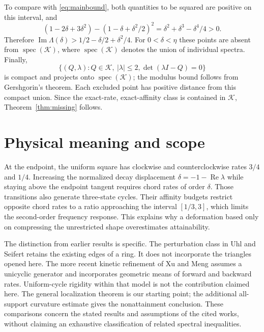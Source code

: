 \documentclass[11pt,a4paper]{article}
\newcommand{\K}{\mathcal K}
\newcommand{\spec}{\operatorname{spec}}
\newcommand{\Rea}{\operatorname{Re}}
\newcommand{\Ima}{\operatorname{Im}}
\begin{document}
To compare with \eqref{eq:mainbound}, both quantities to be squared
are positive on this interval, and
\begin{equation}\label{eq:separation}
 (1-2\delta+3\delta^2)-(1-\delta+\delta^2/2)^2
 =\delta^2+\delta^3-\delta^4/4>0.
\end{equation}
Therefore $\Ima\Lambda(\delta)>1/2-\delta/2+\delta^2/4$.
For $0<\delta<\eta$ these points are absent from $\spec(\K)$,
where $\spec(\K)$ denotes the union of individual spectra.
Finally,
\begin{equation}
 \{(Q,\lambda):Q\in\K,\ |\lambda|\leq2,
                  \det(\lambda I-Q)=0\}
\end{equation}
is compact and projects onto $\spec(\K)$; the modulus bound follows
from Gershgorin's theorem. Each excluded point has positive distance
from this compact union. Since the exact-rate, exact-affinity class
is contained in $\K$, Theorem~\ref{thm:missing} follows.

\section{Physical meaning and scope}

At the endpoint, the uniform square has clockwise and counterclockwise
rates $3/4$ and $1/4$. Increasing the normalized decay displacement
$\delta=-1-\Rea\lambda$ while staying above the endpoint tangent
requires chord rates of order $\delta$. Those transitions also generate
three-state cycles. Their affinity budgets restrict opposite chord rates
to a ratio approaching the interval $[1/3,3]$, which limits the
second-order frequency response. This explains why a deformation based
only on compressing the unrestricted shape overestimates attainability.

The distinction from earlier results is specific. The perturbation
class in Uhl and Seifert \cite[Sec.~4.1, condition~(i), and
Sec.~4.2]{UhlSeifert2019} retains the existing edges of a ring.
It does not incorporate the triangles opened here. The more recent
kinetic refinement of Xu and Meng \cite[Secs.~II--III and
Corollary~3]{XuMeng2026} assumes a unicyclic generator and incorporates
geometric means of forward and backward rates. Uniform-cycle rigidity
within that model is not the contribution claimed here. The general
localization theorem \cite{Kolchinsky2026} is our starting point;
the additional all-support curvature estimate gives the nonattainment
conclusion. These comparisons concern the stated results and assumptions
of the cited works, without claiming an exhaustive classification of
related spectral inequalities.
\end{document}
